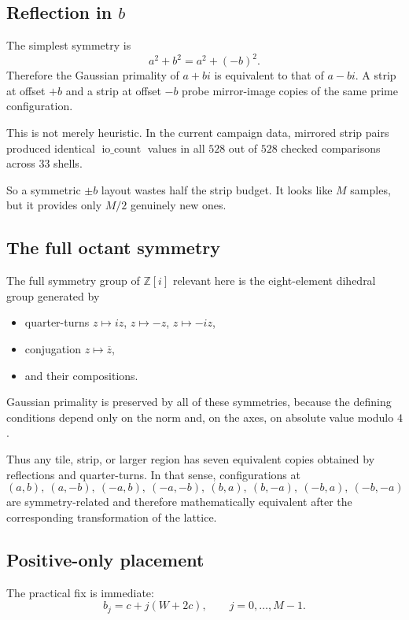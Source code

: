 \documentclass[12pt,letterpaper]{article}
\theoremstyle{definition}
\theoremstyle{remark}
\newcommand{\Zi}{\mathbb{Z}[i]}
\newcommand{\iocount}{\operatorname{io\_count}}
\begin{document}
\subsection{Reflection in \texorpdfstring{$b$}{b}}

The simplest symmetry is
\[
a^2+b^2=a^2+(-b)^2.
\]
Therefore the Gaussian primality of $a+bi$ is equivalent to that of $a-bi$. A strip at offset $+b$ and a strip at offset $-b$ probe mirror-image copies of the same prime configuration.

This is not merely heuristic. In the current campaign data, mirrored strip pairs produced identical $\iocount$ values in all $528$ out of $528$ checked comparisons across $33$ shells.

So a symmetric $\pm b$ layout wastes half the strip budget. It looks like $M$ samples, but it provides only $M/2$ genuinely new ones.

\subsection{The full octant symmetry}

The full symmetry group of $\Zi$ relevant here is the eight-element dihedral group generated by

\begin{itemize}
\item quarter-turns $z\mapsto iz$, $z\mapsto -z$, $z\mapsto -iz$,
\item conjugation $z\mapsto \overline{z}$,
\item and their compositions.
\end{itemize}

Gaussian primality is preserved by all of these symmetries, because the defining conditions depend only on the norm and, on the axes, on absolute value modulo $4$.

Thus any tile, strip, or larger region has seven equivalent copies obtained by reflections and quarter-turns. In that sense, configurations at
\[
(a,b),\ (a,-b),\ (-a,b),\ (-a,-b),\ (b,a),\ (b,-a),\ (-b,a),\ (-b,-a)
\]
are symmetry-related and therefore mathematically equivalent after the corresponding transformation of the lattice.

\subsection{Positive-only placement}

The practical fix is immediate:
\[
b_j=c+j(W+2c),\qquad j=0,\dots,M-1.
\]
\end{document}
